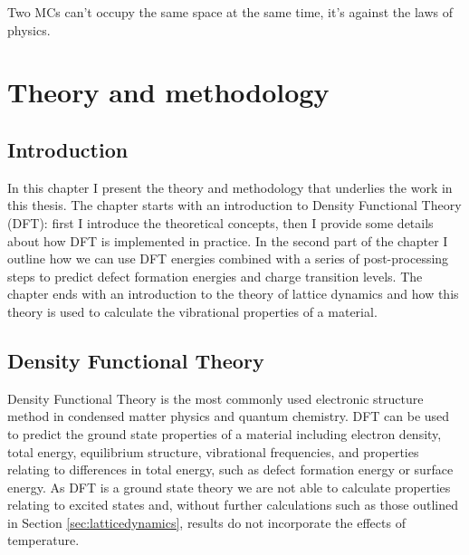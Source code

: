 \begin{savequote}[8cm]
Two MCs can't occupy the same space at the same time,
it's against the laws of physics.
\end{savequote}

\chapter{\label{ch:3-methods}Theory and methodology}

\minitoc



\section{Introduction} 

In this chapter I present the theory and methodology that underlies the work in this thesis. The chapter starts with an introduction to Density Functional Theory (DFT): first I introduce the theoretical concepts, then I provide some details about how DFT is implemented in practice. In the second part of the chapter I outline how we can use DFT energies combined with a series of post-processing steps to predict defect formation energies and charge transition levels. The chapter ends with an introduction to the theory of lattice dynamics and how this theory is used to calculate the vibrational properties of a material. 

\section{Density Functional Theory} \label{DFTtheory}

Density Functional Theory is the most commonly used electronic structure method in condensed matter physics and quantum chemistry. 
DFT can be used to predict the ground state properties of a material including electron density, total energy, equilibrium structure, vibrational frequencies, and properties relating to differences in total energy, such as defect formation energy or surface energy. 
As DFT is a ground state theory we are not able to calculate properties relating to excited states and, without further calculations such as those outlined in Section \ref{sec:latticedynamics}, results do not incorporate the effects of temperature. 


